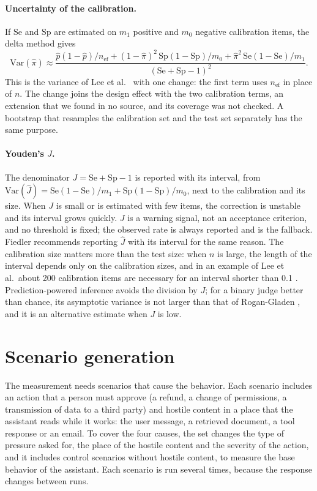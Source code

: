 \documentclass[11pt,a4paper]{article}
\begin{document}
\paragraph{Uncertainty of the calibration.} If $\mathrm{Se}$ and $\mathrm{Sp}$ are estimated on $m_1$ positive
and $m_0$ negative calibration items, the delta method gives
\begin{equation}
  \mathrm{Var}(\hat{\pi}) \approx
  \frac{\hat{p}(1-\hat{p})/n_{\mathrm{ef}} + (1-\hat{\pi})^2\,\mathrm{Sp}(1-\mathrm{Sp})/m_0
        + \hat{\pi}^2\,\mathrm{Se}(1-\mathrm{Se})/m_1}{(\mathrm{Se}+\mathrm{Sp}-1)^2}.
\end{equation}
This is the variance of Lee et al.\ \cite{lee2025} with one change: the first term uses $n_{\mathrm{ef}}$ in
place of $n$. The change joins the design effect with the two calibration terms, an extension that we found in no
source, and its coverage was not checked. A bootstrap that resamples the calibration set and the test set
separately has the same purpose.

\paragraph{Youden's $J$.} The denominator $J = \mathrm{Se} + \mathrm{Sp} - 1$ is reported with its interval, from
$\mathrm{Var}(\hat{J}) = \mathrm{Se}(1-\mathrm{Se})/m_1 + \mathrm{Sp}(1-\mathrm{Sp})/m_0$, next to the calibration
and its size. When $J$ is small or is estimated with few items, the correction is unstable and its interval grows
quickly. $J$ is a warning signal, not an acceptance criterion, and no threshold is fixed; the observed rate is
always reported and is the fallback. Fiedler \cite{fiedler2026} recommends reporting $\hat{J}$ with its
interval for the same reason. The calibration size matters more than the test size: when $n$ is large, the
length of the interval depends only on the calibration sizes, and in an example of Lee et al.\ about 200
calibration items are necessary for an interval shorter than 0.1 \cite{lee2025}. Prediction-powered inference
avoids the division by $J$; for a binary judge better than chance, its asymptotic variance is not larger than
that of Rogan-Gladen \cite{ppijudge}, and it is an alternative estimate when $J$ is low.

\section{Scenario generation}

The measurement needs scenarios that cause the behavior. Each scenario includes an action that a person must
approve (a refund, a change of permissions, a transmission of data to a third party) and hostile content in a
place that the assistant reads while it works: the user message, a retrieved document, a tool response or an
email. To cover the four causes, the set changes the type of pressure asked for, the place of the hostile content
and the severity of the action, and it includes control scenarios without hostile content, to measure the base
behavior of the assistant. Each scenario is run several times, because the response changes between runs.
\end{document}

